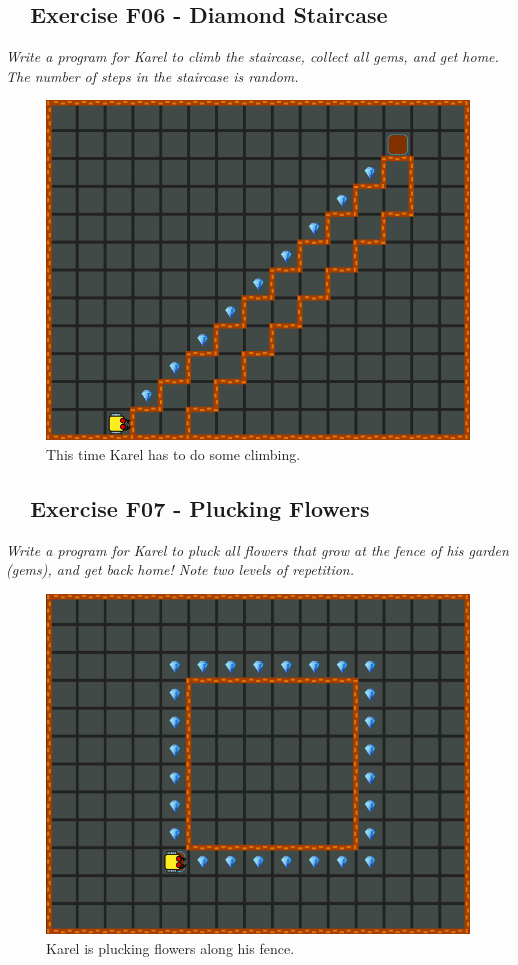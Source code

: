 \documentclass[article,A4,12pt]{llncs}
\begin{document}
{{{{\subsection{\ \ Exercise F06 - Diamond Staircase}

{\em Write a program for Karel to climb the staircase, collect all gems, and 
get home. The number of steps in the staircase is random. }


\begin{figure}[!ht]
\begin{center}
\includegraphics[height=0.4\textwidth]{img/f06.png}
\end{center}
\vspace{-4mm}
\caption{This time Karel has to do some climbing.}
\label{fig:f06}
\vspace{-10mm}
\end{figure}
\noindent
\newpage


\subsection{\ \ Exercise F07 - Plucking Flowers}

{\em Write a program for Karel to pluck all flowers that grow at the fence of his garden (gems), and get back home! Note two levels of repetition.}\\[-7mm]


\begin{figure}[!ht]
\begin{center}
\includegraphics[height=0.4\textwidth]{img/f07.png}
\end{center}
\vspace{-4mm}
\caption{Karel is plucking flowers along his fence.}
\label{fig:f07}
\vspace{-4mm}
\end{figure}
\noindent

}}}}
\end{document}
